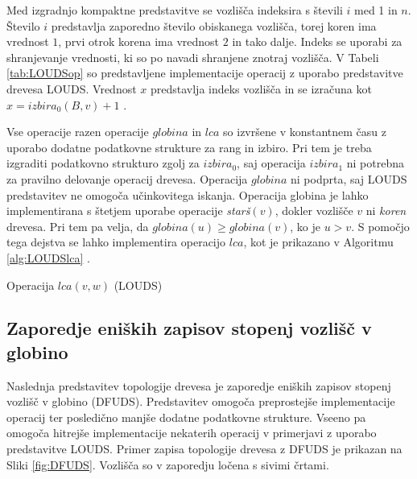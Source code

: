 Med izgradnjo kompaktne predstavitve se  vozlišča indeksira s števili $i$ med 1 in $n$. Število $i$ predstavlja zaporedno število obiskanega vozlišča, torej koren ima vrednost $1$, prvi otrok korena ima vrednost $2$ in tako dalje. Indeks se uporabi za shranjevanje vrednosti, ki so po navadi shranjene znotraj vozlišča. V Tabeli \ref{tab:LOUDSop} so predstavljene implementacije operacij z uporabo predstavitve drevesa LOUDS. Vrednost $x$ predstavlja indeks vozlišča in se izračuna kot $x=izbira_0(B,v)+1$ \cite{Navarro2016}.


Vse operacije razen operacije $globina$ in $lca$ so izvršene v konstantnem času z uporabo dodatne podatkovne strukture za rang in izbiro. Pri tem je treba izgraditi podatkovno strukturo zgolj za $izbira_0$, saj operacija $izbira_1$ ni potrebna za pravilno delovanje operacij drevesa. Operacija $globina$ ni podprta, saj LOUDS predstavitev ne omogoča učinkovitega iskanja. Operacija globina je lahko implementirana s štetjem uporabe operacije \textit{starš}$(v)$, dokler vozlišče $v$ ni \textit{koren} drevesa. Pri tem pa velja, da $globina(u)\ge globina(v)$, ko je $u>v$. S pomočjo tega dejstva se lahko implementira operacijo $lca$, kot je prikazano v Algoritmu \ref{alg:LOUDSlca} \cite{Navarro2016}.
 
\begin{algorithm}[hbt]

\caption{Operacija $lca(v,w)$ (LOUDS)}\label{alg:LOUDSlca}
{
    
}
\end{algorithm}


\subsection{Zaporedje eniških zapisov stopenj vozlišč v globino}\label{sec:DFUDS}

Naslednja predstavitev topologije drevesa je zaporedje eniških zapisov stopenj vozlišč v globino (DFUDS). Predstavitev omogoča preprostejše implementacije operacij ter posledično manjše dodatne podatkovne strukture. Vseeno pa omogoča hitrejše implementacije nekaterih operacij v primerjavi z uporabo predstavitve LOUDS. Primer zapisa topologije drevesa z DFUDS je prikazan na Sliki \ref{fig:DFUDS}. Vozlišča so v zaporedju ločena s sivimi črtami.

